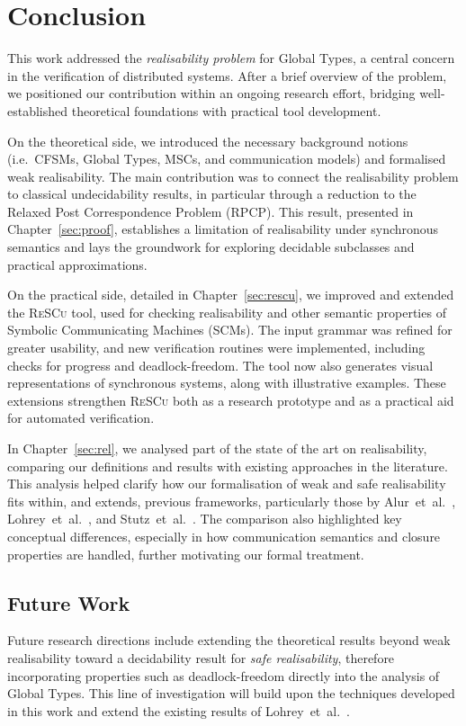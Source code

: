 \chapter{Conclusion}\label{sec:end}
This work addressed the \emph{realisability problem} for Global 
Types, a central concern in the verification of distributed systems. 
After a brief overview of the problem, we positioned our contribution 
within an ongoing research effort, bridging well-established 
theoretical foundations with practical tool development.  

On the theoretical side, we introduced the necessary background 
notions (i.e.\ CFSMs, Global Types, MSCs, and communication models) and 
formalised weak realisability. The main contribution was to connect 
the realisability problem to classical undecidability results, in 
particular through a reduction to the Relaxed Post Correspondence 
Problem (RPCP). This result, presented in 
Chapter~\ref{sec:proof}, establishes a limitation 
of realisability under synchronous semantics and lays the groundwork 
for exploring decidable subclasses and practical approximations.

On the practical side, detailed in Chapter~\ref{sec:rescu}, we improved 
and extended the \textsc{ReSCu} tool, used for checking realisability 
and other semantic properties of Symbolic Communicating Machines 
(SCMs). The input grammar was refined for greater usability, and new 
verification routines were implemented, including checks for progress 
and deadlock-freedom. The tool now also generates visual 
representations of synchronous systems, along with illustrative 
examples. These extensions strengthen \textsc{ReSCu} both as a research 
prototype and as a practical aid for automated verification.

In Chapter~\ref{sec:rel}, we analysed part of the state of the art on 
realisability, comparing our definitions and results with existing 
approaches in the literature. This analysis helped clarify how our 
formalisation of weak and safe realisability fits within, and extends, 
previous frameworks, particularly those by 
Alur~et~al.~\cite{alur2005realizability}, 
Lohrey~et~al.~\cite{lohrey2003realizability}, and 
Stutz~et~al.~\cite{stutz2024implementability}. The comparison also 
highlighted key conceptual differences, especially in how communication 
semantics and closure properties are handled, further motivating our 
formal treatment.

\section{Future Work}
Future research directions include extending the theoretical results
beyond weak realisability toward a decidability result for
\emph{safe realisability}, therefore incorporating properties such as
deadlock-freedom directly into the analysis of Global Types. This line
of investigation will build upon the techniques developed in this work
and extend the existing results of Lohrey~et~al.~\cite{lohrey2003realizability}.  

